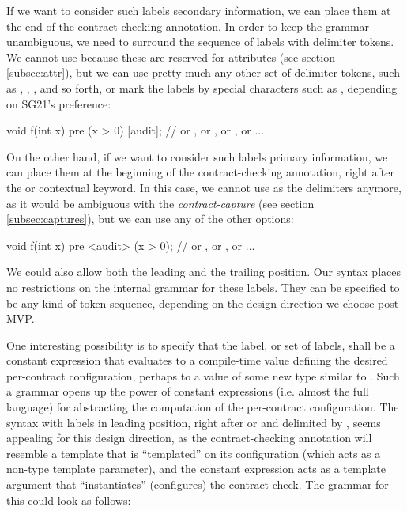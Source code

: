 If we want to consider such labels secondary information, we can place them at the end of the contract-checking annotation. In order to keep the grammar unambiguous, we need to surround the sequence of labels with delimiter tokens. We cannot use \tcode{[[ ... ]]} because these are reserved for attributes (see section \ref{subsec:attr}), but we can use pretty much any other set of delimiter tokens, such as \mbox{\tcode{[ ...]}}, \mbox{}, \mbox{}, and so forth, or mark the labels by special characters such as , depending on SG21's preference:

\begin{codeblock}
void f(int x)
  pre (x > 0) [audit];   // or , or , or \tcode{[\{audit\}]}, or  ...
\end{codeblock}

On the other hand, if we want to consider such labels primary information, we can place them at the beginning of the contract-checking annotation, right after the  or  contextual keyword. In this case, we cannot use \mbox{\tcode{[...]}} as the delimiters anymore, as it would be ambiguous with the \emph{contract-capture} (see section \ref{subsec:captures}), but we can use any of the other options:

\begin{codeblock}
void f(int x)
  pre <audit> (x > 0);    // or , or \tcode{[\{audit\}]}, or  ...
\end{codeblock}

We could also allow both the leading and the trailing position. Our syntax places no restrictions on the internal grammar for these labels. They can be specified to be any kind of token sequence, depending on the design direction we choose post MVP.

One interesting possibility is to specify that the label, or set of labels, shall be a constant expression that evaluates to a compile-time value defining the desired per-contract configuration, perhaps to a value of some new type  similar to . Such a grammar opens up the power of constant expressions (i.e. almost the full language) for abstracting the computation of the per-contract configuration. The syntax with labels in leading position, right after  or  and delimited by \mbox{}, seems appealing for this design direction, as the contract-checking annotation will resemble a template that is ``templated'' on its configuration (which acts as a non-type template parameter), and the constant expression acts as a template argument that ``instantiates'' (configures) the contract check. The grammar for this could look as follows:

